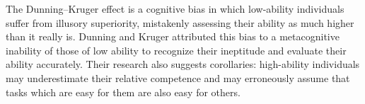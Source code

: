 

The Dunning–Kruger effect is a cognitive bias in which low-ability individuals suffer from illusory superiority, mistakenly assessing their ability as much higher than it really is. Dunning and Kruger attributed this bias to a metacognitive inability of those of low ability to recognize their ineptitude and evaluate their ability accurately. Their research also suggests corollaries: high-ability individuals may underestimate their relative competence and may erroneously assume that tasks which are easy for them are also easy for others.